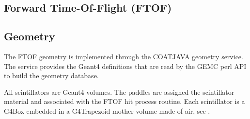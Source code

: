 \subsection{Forward Time-Of-Flight (FTOF)}

\subsection{Geometry}

The FTOF geometry is implemented through the COATJAVA geometry service.
The service provides the Geant4 definitions that are read by the GEMC perl API to build the geometry database.

All scintillators are Geant4 volumes. The paddles are assigned the scintillator material and associated with the FTOF hit process routine.
Each scintillator is a G4Box embedded in a G4Trapezoid mother volume made of air, see . 

